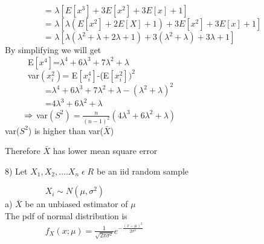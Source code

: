 \documentclass[]{article}
\begin{document}
$ \hspace{2cm} $= $\lambda[E[x^{3}]+3E[x^{2}]+3E[x]+1]$ \\

$ \hspace{2cm} $= $\lambda[\lambda(E[x^{2}]+2E[X]+1)+3E[x^{2}]+3E[x]+1]$ \\

$ \hspace{2cm} $=
$\lambda[\lambda(\lambda^{2}+\lambda+2\lambda+1)+3(\lambda^{2}+\lambda)+3\lambda+1]$ \\

By simplifying we will get\\

$\hspace{1cm}$ E$[x^{4}]$=$ \lambda^{4}+6\lambda^{3}+7\lambda^{2}+\lambda $\\

$\hspace{1cm}$ var$(x_i^{2})$= E$[x_{i}^{4}]$-(E$[x_i^{2}])^{2} $ \\
 
$\hspace{2cm}$=$\lambda^{4}+6\lambda^{3}+7\lambda^{2}+\lambda-(\lambda^{2}+\lambda)^{2} $\\
 
$\hspace{2cm}$=$4\lambda^{3}+6\lambda^{2}+\lambda$\\

$\hspace{0.8cm}\Rightarrow$ var$(S^{2}) = \frac{n}{(n-1)^{2}} (4\lambda^{3} + 6\lambda^{2} + \lambda) $\\

var($S^{2}$) is higher than var($\bar X$)

Therefore $\bar X$ has lower mean square error

\begin{flushleft}
8) Let $X_1,X_2,....X_n\;\epsilon\;R$ be an iid random sample
\end{flushleft}

$\hspace{2cm}X_i\sim N(\mu,\sigma^{2})$\\

a) $\bar X$ be an unbiased estimator of $\mu$\\

The pdf of normal distribution is\\

$\hspace{2cm} f_{X}(x;\mu) = \frac{1}{\sqrt{2\pi\sigma^{2}}} e^{-\frac{(x-\mu)^{2}}{2\sigma^{2}}}$\\
\end{document}
